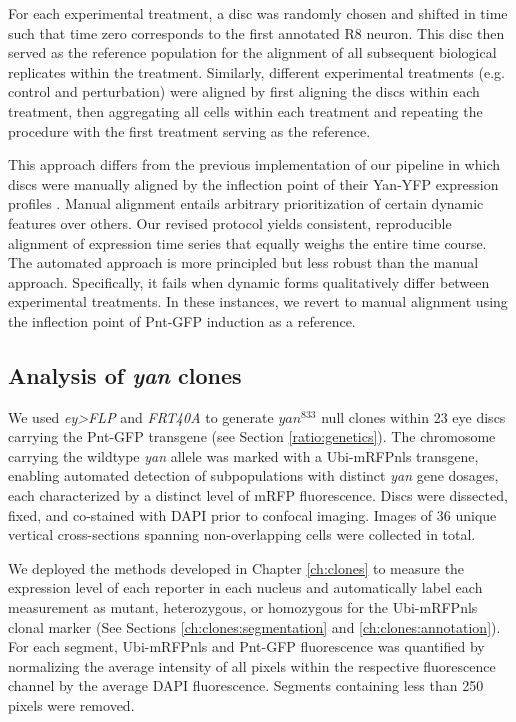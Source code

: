 For each experimental treatment, a disc was randomly chosen and shifted in time such that time zero corresponds to the first annotated R8 neuron. This disc then served as the reference population for the alignment of all subsequent biological replicates within the treatment. Similarly, different experimental treatments (e.g. control and perturbation) were aligned by first aligning the discs within each treatment, then aggregating all cells within each treatment and repeating the procedure with the first treatment serving as the reference.

This approach differs from the previous implementation of our pipeline in which discs were manually aligned by the inflection point of their Yan-YFP expression profiles \cite{Pelaez2015a}. Manual alignment entails arbitrary prioritization of certain dynamic features over others. Our revised protocol yields consistent, reproducible alignment of expression time series that equally weighs the entire time course. The automated approach is more principled but less robust than the manual approach. Specifically, it fails when dynamic forms qualitatively differ between experimental treatments. In these instances, we revert to manual alignment using the inflection point of Pnt-GFP induction as a reference.

\subsection{Analysis of \textit{yan} clones}
\label{appendix:methods:ratio:clones}

We used \textit{ey>FLP} and \textit{FRT40A} to generate $yan^{833}$ null clones within 23 eye discs carrying the Pnt-GFP transgene (see Section \ref{ratio:genetics}). The chromosome carrying the wildtype \textit{yan} allele was marked with a Ubi-mRFPnls transgene, enabling automated detection of subpopulations with distinct \textit{yan} gene dosages, each characterized by a distinct level of mRFP fluorescence. Discs were dissected, fixed, and co-stained with DAPI prior to confocal imaging. Images of 36 unique vertical cross-sections spanning non-overlapping cells were collected in total. 

We deployed the methods developed in Chapter \ref{ch:clones} to measure the expression level of each reporter in each nucleus and automatically label each measurement as mutant, heterozygous, or homozygous for the Ubi-mRFPnls clonal marker (See Sections \ref{ch:clones:segmentation} and \ref{ch:clones:annotation}). For each segment, Ubi-mRFPnls and Pnt-GFP fluorescence was quantified by normalizing the average intensity of all pixels within the respective fluorescence channel by the average DAPI fluorescence. Segments containing less than 250 pixels were removed. 

